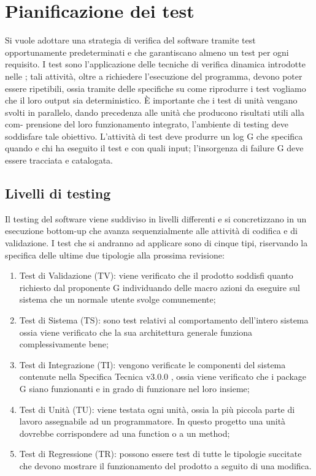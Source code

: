 \section{Pianificazione dei test}

	Si vuole adottare una strategia di verifica del software tramite test opportunamente predeterminati e che garantiscano almeno un test per ogni requisito. I test sono l’applicazione delle tecniche di verifica dinamica introdotte nelle \NormeDiProgetto; tali attività, oltre a richiedere l’esecuzione del programma, devono poter essere ripetibili, ossia tramite delle specifiche su come riprodurre i test vogliamo che il loro output sia deterministico. È importante che i test di unità vengano svolti in parallelo, dando precedenza alle unità che producono risultati utili alla com- prensione del loro funzionamento integrato, l’ambiente di testing deve soddisfare tale obiettivo. L’attività di test deve produrre un log G che specifica quando e chi ha eseguito il test e con quali input; l’insorgenza di failure G deve essere tracciata e catalogata.

\subsection{Livelli di testing}
	Il testing del software viene suddiviso in livelli differenti e si concretizzano in un esecuzione bottom-up che avanza sequenzialmente alle attività di codifica e di validazione. I test che si andranno ad applicare sono di cinque tipi, riservando la specifica delle ultime due tipologie alla prossima revisione:

\begin{enumerate}
	\item Test di Validazione (TV): viene verificato che il prodotto soddisfi quanto richiesto dal proponente G individuando delle macro azioni da eseguire sul sistema che un normale utente svolge comunemente;
	\item Test di Sistema (TS): sono test relativi al comportamento dell’intero sistema ossia viene verificato che la sua architettura generale funziona complessivamente bene;
	\item Test di Integrazione (TI): vengono verificate le componenti del sistema contenute nella Specifica Tecnica v3.0.0 , ossia viene verificato che i package G siano funzionanti e in grado di funzionare nel loro insieme;
	\item Test di Unità (TU): viene testata ogni unità, ossia la più piccola parte di lavoro assegnabile ad un programmatore. In questo progetto una unità dovrebbe corrispondere ad una function o a un method;
	\item Test di Regressione (TR): possono essere test di tutte le tipologie succitate che devono mostrare il funzionamento del prodotto a seguito di una modifica.
\end{enumerate}

